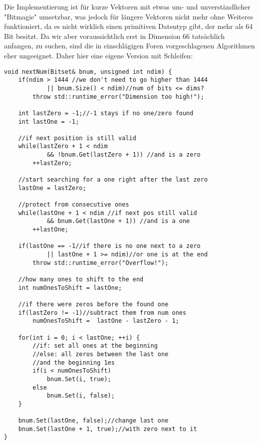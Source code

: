 \documentclass{article}
\begin{document}
Die Implementierung ist für kurze Vektoren mit etwas um- und unverständlicher "Bitmagie" umsetzbar, was jedoch für längere Vektoren nicht mehr ohne Weiteres funktioniert, da es nicht wirklich einen primitiven Datentyp gibt, der mehr als 64 Bit besitzt. Da wir aber voraussichtlich erst in Dimension 66 tatsächlich anfangen, zu suchen, sind die in einschlägigen Foren vorgeschlagenen Algorithmen eher ungeeignet. Daher hier eine eigene Version mit Schleifen:

\clearpage

\lstset{language=C++}

\begin{lstlisting}[frame=single]
void nextNum(Bitset& bnum, unsigned int ndim) {
    if(ndim > 1444 //we don't need to go higher than 1444
            || bnum.Size() < ndim)//num of bits <= dims?
        throw std::runtime_error("Dimension too high!");

    int lastZero = -1;//-1 stays if no one/zero found
    int lastOne = -1;

    //if next position is still valid
    while(lastZero + 1 < ndim
            && !bnum.Get(lastZero + 1)) //and is a zero
        ++lastZero;

    //start searching for a one right after the last zero
    lastOne = lastZero;

    //protect from consecutive ones
    while(lastOne + 1 < ndim //if next pos still valid
            && bnum.Get(lastOne + 1)) //and is a one
        ++lastOne;

    if(lastOne == -1//if there is no one next to a zero
            || lastOne + 1 >= ndim)//or one is at the end
        throw std::runtime_error("Overflow!");

    //how many ones to shift to the end
    int numOnesToShift = lastOne;

    //if there were zeros before the found one
    if(lastZero != -1)//subtract them from num ones
        numOnesToShift =  lastOne - lastZero - 1;

    for(int i = 0; i < lastOne; ++i) {
        //if: set all ones at the beginning
        //else: all zeros between the last one
        //and the beginning 1es
        if(i < numOnesToShift)
            bnum.Set(i, true);
        else
            bnum.Set(i, false);
    }

    bnum.Set(lastOne, false);//change last one
    bnum.Set(lastOne + 1, true);//with zero next to it
}
\end{lstlisting}
\end{document}
